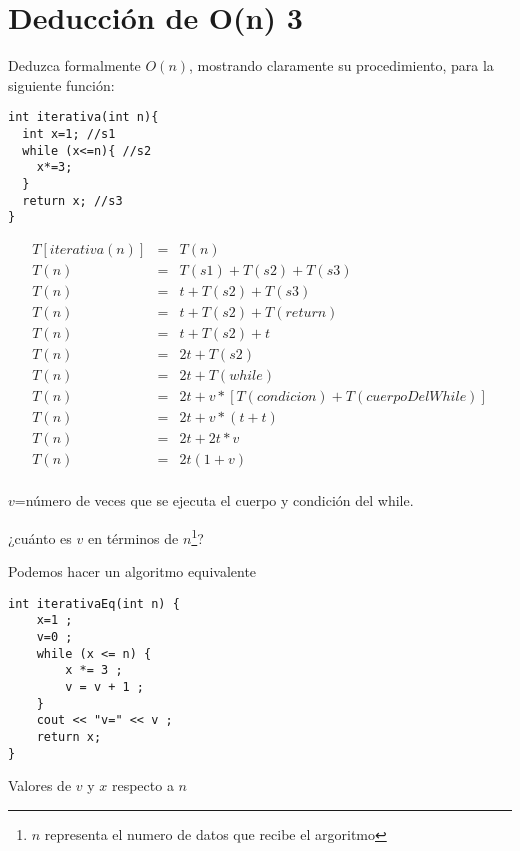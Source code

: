 \section{Deducción de O(n) 3}
Deduzca formalmente $O(n)$, mostrando claramente su procedimiento,
para la siguiente función:
\begin{lstlisting}[style=miEstilo, numbers=none]
int iterativa(int n){
  int x=1; //s1
  while (x<=n){ //s2
    x*=3;
  }
  return x; //s3
}
\end{lstlisting}

\begin{eqnarray*}
  T[iterativa(n)] &=& T(n)\\
  T(n)&=&T(s1)+T(s2)+T(s3)\\
  T(n)&=&t+T(s2)+T(s3)\\
  T(n)&=&t+T(s2)+T(return)\\
  T(n)&=&t+T(s2)+t\\
  T(n)&=&2t+T(s2)\\
  T(n)&=&2t+T(while)\\
  T(n)&=&2t+v*[T(condicion)+T(cuerpoDelWhile)]\\
  T(n)&=&2t+v*(t+t)\\
  T(n)&=&2t+2t*v\\
  T(n)&=&2t(1+v)\\
\end{eqnarray*}

$v$=número de veces que se ejecuta el cuerpo y condición del while.

¿cuánto es $v$ en términos de $n$\footnote{$n$ representa el numero de
  datos que recibe el argoritmo}?

Podemos hacer un algoritmo equivalente
\begin{verbatim}
int iterativaEq(int n) {
    x=1 ;
    v=0 ;
    while (x <= n) {
        x *= 3 ;
        v = v + 1 ;
    }
    cout << "v=" << v ;
    return x;
}
\end{verbatim}
Valores de $v$ y $x$ respecto a $n$

